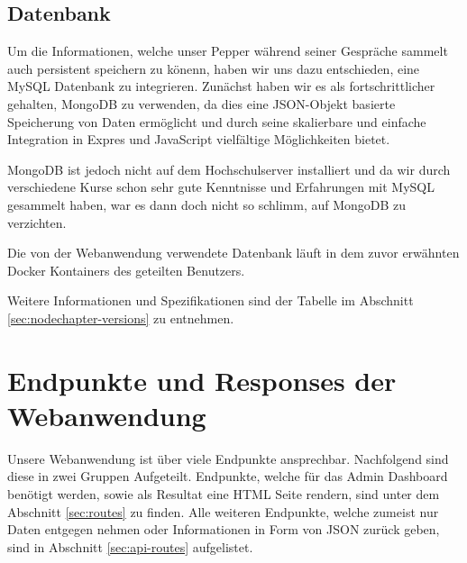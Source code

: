 \subsection{Datenbank}
\label{sec:nodechapter-database}
Um die Informationen, welche unser Pepper während seiner Gespräche sammelt auch persistent speichern zu könenn,
haben wir uns dazu entschieden, eine MySQL Datenbank zu integrieren. Zunächst haben wir es als fortschrittlicher
gehalten, MongoDB zu verwenden, da dies eine JSON-Objekt basierte Speicherung von Daten ermöglicht und durch seine
skalierbare und einfache Integration in Expres und JavaScript vielfältige Möglichkeiten bietet.

MongoDB ist jedoch nicht auf dem Hochschulserver installiert und da wir durch verschiedene Kurse schon sehr gute Kenntnisse
und Erfahrungen mit MySQL gesammelt haben, war es dann doch nicht so schlimm, auf MongoDB zu verzichten.

Die von der Webanwendung verwendete Datenbank läuft in dem zuvor erwähnten Docker Kontainers des geteilten Benutzers.

Weitere Informationen und Spezifikationen sind der Tabelle im Abschnitt \ref{sec:nodechapter-versions} zu entnehmen.




\newpage
\section{Endpunkte und Responses der Webanwendung}
\label{sec:nodechapter-implementation-routes}
Unsere Webanwendung ist über viele Endpunkte ansprechbar.
Nachfolgend sind diese in zwei Gruppen Aufgeteilt.
Endpunkte, welche für das Admin Dashboard benötigt werden, sowie als Resultat eine HTML Seite rendern,
sind unter dem Abschnitt \ref{sec:routes} zu finden.
Alle weiteren Endpunkte, welche zumeist nur Daten entgegen nehmen oder Informationen in Form
von JSON zurück geben, sind in Abschnitt \ref{sec:api-routes} aufgelistet.

